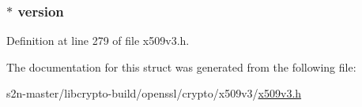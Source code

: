 \subsubsection[{\texorpdfstring{version}{version}}]{ $\ast$ version}\hypertarget{struct_s_x_n_e_t__st_abf367aeef355b6acf5be7c569c4b28b0}{}\label{struct_s_x_n_e_t__st_abf367aeef355b6acf5be7c569c4b28b0}


Definition at line 279 of file x509v3.\+h.



The documentation for this struct was generated from the following file\+:\begin{DoxyCompactItemize}
\item 
s2n-\/master/libcrypto-\/build/openssl/crypto/x509v3/\hyperlink{crypto_2x509v3_2x509v3_8h}{x509v3.\+h}\end{DoxyCompactItemize}
